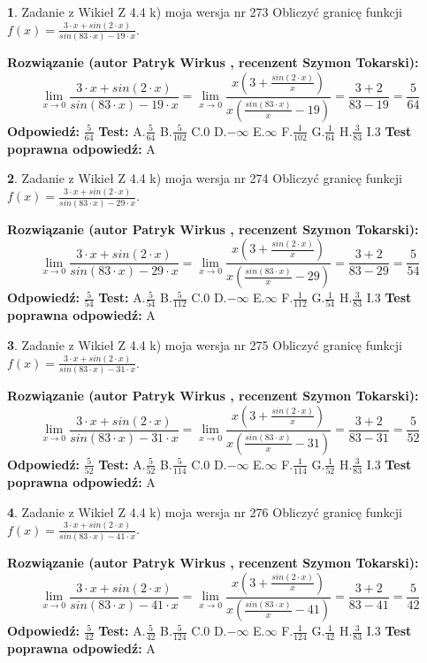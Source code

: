 \documentclass[12pt, a4paper]{article}
\theoremstyle{definition} %
\newtheorem{zad}{}
\newcommand{\zadStart}[1]{\begin{zad}#1\newline}
\newcommand{\zadStop}{\end{zad}}
\newcommand{\rozwStart}[2]{\noindent \textbf{Rozwiązanie (autor #1 , recenzent #2): }\newline}
\newcommand{\rozwStop}{\newline}
\newcommand{\odpStart}{\noindent \textbf{Odpowiedź:}\newline}
\newcommand{\odpStop}{\newline}
\newcommand{\testStart}{\noindent \textbf{Test:}\newline}
\newcommand{\testStop}{\newline}
\newcommand{\kluczStart}{\noindent \textbf{Test poprawna odpowiedź:}\newline}
\newcommand{\kluczStop}{\newline}
\begin{document}
\zadStart{Zadanie z Wikieł Z 4.4 k) moja wersja nr 273}
Obliczyć granicę funkcji $f(x)=\frac{3\cdot x +sin(2\cdot x)}{sin(83\cdot x) -19\cdot x}$.
\zadStop
\rozwStart{Patryk Wirkus}{Szymon Tokarski}
$$\lim\limits_{x\to 0}\frac{3\cdot x +sin(2\cdot x)}{sin(83\cdot x) -19\cdot x}
=\lim\limits_{x\to 0}\frac{x(3+\frac{sin(2\cdot x)}{x})}{x(\frac{sin(83\cdot x)}{x}-19)}
=\frac{3+2}{83-19} = \frac{5}{64}$$
\rozwStop
\odpStart
$\frac{5}{64}$
\odpStop
\testStart
A.$\frac{5}{64}$
B.$\frac{5}{102}$
C.$0$
D.$-\infty$
E.$\infty$
F.$\frac{1}{102}$
G.$\frac{1}{64}$
H.$\frac{3}{83}$
I.$3$
\testStop
\kluczStart
A
\kluczStop



\zadStart{Zadanie z Wikieł Z 4.4 k) moja wersja nr 274}
Obliczyć granicę funkcji $f(x)=\frac{3\cdot x +sin(2\cdot x)}{sin(83\cdot x) -29\cdot x}$.
\zadStop
\rozwStart{Patryk Wirkus}{Szymon Tokarski}
$$\lim\limits_{x\to 0}\frac{3\cdot x +sin(2\cdot x)}{sin(83\cdot x) -29\cdot x}
=\lim\limits_{x\to 0}\frac{x(3+\frac{sin(2\cdot x)}{x})}{x(\frac{sin(83\cdot x)}{x}-29)}
=\frac{3+2}{83-29} = \frac{5}{54}$$
\rozwStop
\odpStart
$\frac{5}{54}$
\odpStop
\testStart
A.$\frac{5}{54}$
B.$\frac{5}{112}$
C.$0$
D.$-\infty$
E.$\infty$
F.$\frac{1}{112}$
G.$\frac{1}{54}$
H.$\frac{3}{83}$
I.$3$
\testStop
\kluczStart
A
\kluczStop



\zadStart{Zadanie z Wikieł Z 4.4 k) moja wersja nr 275}
Obliczyć granicę funkcji $f(x)=\frac{3\cdot x +sin(2\cdot x)}{sin(83\cdot x) -31\cdot x}$.
\zadStop
\rozwStart{Patryk Wirkus}{Szymon Tokarski}
$$\lim\limits_{x\to 0}\frac{3\cdot x +sin(2\cdot x)}{sin(83\cdot x) -31\cdot x}
=\lim\limits_{x\to 0}\frac{x(3+\frac{sin(2\cdot x)}{x})}{x(\frac{sin(83\cdot x)}{x}-31)}
=\frac{3+2}{83-31} = \frac{5}{52}$$
\rozwStop
\odpStart
$\frac{5}{52}$
\odpStop
\testStart
A.$\frac{5}{52}$
B.$\frac{5}{114}$
C.$0$
D.$-\infty$
E.$\infty$
F.$\frac{1}{114}$
G.$\frac{1}{52}$
H.$\frac{3}{83}$
I.$3$
\testStop
\kluczStart
A
\kluczStop



\zadStart{Zadanie z Wikieł Z 4.4 k) moja wersja nr 276}
Obliczyć granicę funkcji $f(x)=\frac{3\cdot x +sin(2\cdot x)}{sin(83\cdot x) -41\cdot x}$.
\zadStop
\rozwStart{Patryk Wirkus}{Szymon Tokarski}
$$\lim\limits_{x\to 0}\frac{3\cdot x +sin(2\cdot x)}{sin(83\cdot x) -41\cdot x}
=\lim\limits_{x\to 0}\frac{x(3+\frac{sin(2\cdot x)}{x})}{x(\frac{sin(83\cdot x)}{x}-41)}
=\frac{3+2}{83-41} = \frac{5}{42}$$
\rozwStop
\odpStart
$\frac{5}{42}$
\odpStop
\testStart
A.$\frac{5}{42}$
B.$\frac{5}{124}$
C.$0$
D.$-\infty$
E.$\infty$
F.$\frac{1}{124}$
G.$\frac{1}{42}$
H.$\frac{3}{83}$
I.$3$
\testStop
\kluczStart
A
\kluczStop
\end{document}
